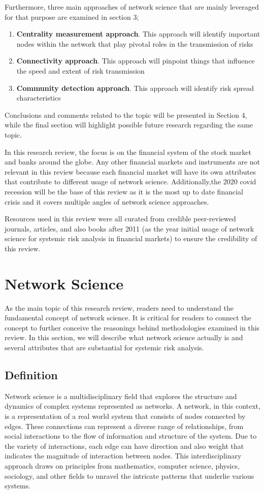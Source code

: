 \documentclass[a4paper,11pt]{article}
\begin{document}
Furthermore, three main approaches of network science that are mainly leveraged for that purpose are examined in section 3; 
\begin{enumerate}
        \item \textbf{Centrality measurement approach}. This approach will identify important nodes within the network that play pivotal roles in the transmission of risks
        \item \textbf{Connectivity approach}. This approach will pinpoint things that influence the speed and extent of risk transmission
        \item \textbf{Community detection approach}. This approach will identify risk spread characteristics
\end{enumerate}
Conclusions and comments related to the topic will be presented in Section 4, while the final section will highlight possible future research regarding the same topic.

In this research review, the focus is on the financial system of the stock market and banks around the globe. Any other financial markets and instruments are not relevant in this review because each financial market will have its own attributes that contribute to different usage of network science. Additionally,the 2020 covid recession will be the base of this review as it is the most up to date financial crisis and it covers multiple angles of network science approaches.

Resources used in this review were all curated from credible peer-reviewed journals, articles, and also books after 2011 (as the year initial usage of network science for systemic risk analysis in financial markets) to ensure the credibility of this review.

\section{Network Science}
As the main topic of this research review, readers need to understand the fundamental concept of network science. It is critical for readers to connect the concept to further conceive the reasonings behind methodologies examined in this review. In this section, we will describe what network science actually is and several attributes that are substantial for systemic risk analysis.

\subsection{Definition}
Network science is a multidisciplinary field that explores the structure and dynamics of complex systems represented as networks. A network, in this context, is a representation of a real world system that consists of nodes connected by edges. These connections can represent a diverse range of relationships, from social interactions to the flow of information and structure of the system. Due to the variety of interactions, each edge can have direction and also weight that indicates the magnitude of interaction between nodes. This interdisciplinary approach draws on principles from mathematics, computer science, physics, sociology, and other fields to unravel the intricate patterns that underlie various systems.
\end{document}
